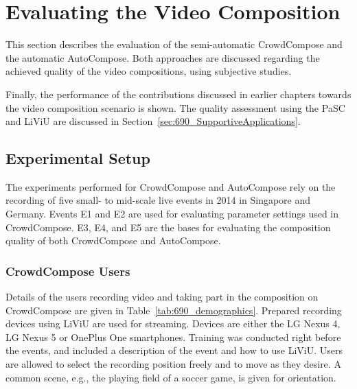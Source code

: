 \section{Evaluating the Video Composition}
\label{690:Evaluating_Composition}
This section describes the evaluation of the semi-automatic CrowdCompose and the automatic AutoCompose.
Both approaches are discussed regarding the achieved quality of the video compositions, using subjective studies.

Finally, the performance of the contributions discussed in earlier chapters towards the video composition scenario is shown.
The quality assessment using the \ac{PaSC} and \ac{LiViU} are discussed in Section~\ref{sec:690_SupportiveApplications}.
\subsection{Experimental Setup}
The experiments performed for CrowdCompose and AutoCompose rely on the recording of five small- to mid-scale live events in 2014 in Singapore and Germany. 
Events E1 and E2 are used for evaluating parameter settings used in CrowdCompose.
E3, E4, and E5 are the bases for evaluating the composition quality of both CrowdCompose and AutoCompose. 
\subsubsection{CrowdCompose Users}
Details of the users recording video and taking part in the composition on CrowdCompose are given in Table~\ref{tab:690_demographics}.
Prepared recording devices using \ac{LiViU} are used for streaming. 
Devices are either the LG Nexus 4, LG Nexus 5 or OnePlus One smartphones. 
Training was conducted right before the events, and included a description of the event and how to use \ac{LiViU}.
Users are allowed to select the recording position freely and to move as they desire. 
A common scene, e.g., the playing field of a soccer game, is given for orientation.

